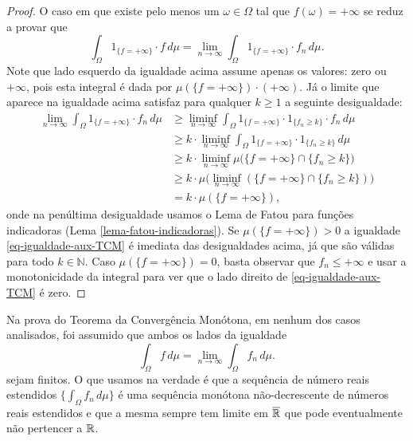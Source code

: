 \begin{proof}
O caso em que existe pelo menos um $\omega\in\Omega$ tal que 
$f(\omega)=+\infty$ se reduz a provar que 
\begin{equation}
\label{eq-igualdade-aux-TCM}
\int_{\Omega} 1_{\{f=+\infty\}}\cdot f\, d\mu
=
\lim_{n\to\infty}
\int_{\Omega} 1_{\{f=+\infty\}}\cdot f_n\, d\mu.
\end{equation}
Note que lado esquerdo da igualdade acima assume apenas 
os valores: zero ou $+\infty$, pois esta integral é dada por
$\mu(\{f=+\infty\})\cdot (+\infty)$. Já o limite que aparece na
igualdade acima satisfaz para qualquer $k\geq 1$ a seguinte 
desigualdade:
\begin{align*}
\lim_{n\to\infty}
\int_{\Omega} 1_{\{f=+\infty\}}\cdot f_n\, d\mu
&\geq 
\liminf_{n\to\infty}
\int_{\Omega} 1_{\{f=+\infty\}}\cdot 1_{\{f_n\geq k\}}\cdot f_n\, d\mu
\\
&\geq 
k\cdot
\liminf_{n\to\infty}
\int_{\Omega} 1_{\{f=+\infty\}}\cdot 1_{\{f_n\geq k\}}\, d\mu
\\
&\geq 
k\cdot
\liminf_{n\to\infty}
\mu\big( \{f=+\infty\}\cap \{f_n\geq k\} \big)
\\
&\geq 
k\cdot
\mu\Big(\liminf_{n\to\infty} (\{f=+\infty\}\cap \{f_n\geq k\}) \Big)
\\
&= 
k\cdot
\mu(\{f=+\infty\}),
\end{align*}
onde na penúltima desigualdade usamos o 
Lema de Fatou para funções indicadoras 
(Lema \ref{lema-fatou-indicadoras}).
Se $\mu(\{f=+\infty\})>0$
a igualdade \eqref{eq-igualdade-aux-TCM} é 
imediata das desigualdades acima, já que são 
válidas para todo $k\in\mathbb{N}$.
Caso $\mu(\{f=+\infty\})=0$, basta observar
que $f_n\leq +\infty$ e usar a monotonicidade
da integral para ver que o lado 
direito de \eqref{eq-igualdade-aux-TCM} é zero.
\end{proof}


\begin{observacao}
Na prova do Teorema da Convergência Monótona, em nenhum 
dos casos analisados, foi assumido que ambos os lados da igualdade 
\[
		\int_{\Omega} f\, d\mu
		=
		\lim_{n\to\infty} \int_{\Omega} f_n\, d\mu.
\]
sejam finitos. O que usamos na verdade é que a 
sequência de número reais estendidos 
$\{\int_{\Omega} f_n\, d\mu\}$ é uma sequência 
monótona não-decrescente de números reais estendidos
e que a mesma sempre tem limite em $\overline{\mathbb{R}}$ 
que pode eventualmente não pertencer a $\mathbb{R}$.
\end{observacao}






